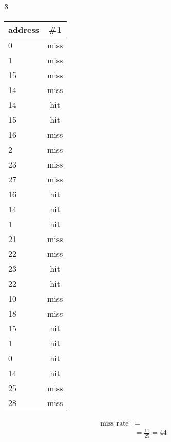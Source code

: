 \documentclass[11pt]{article}
\begin{document}
\paragraph{3}
\begin{center}
	\begin{tabular}{l || c}
		address & \#1 \\
		\hline
		0  & miss \\
		1  & miss \\
		15 & miss \\
		14 & miss \\
		14 & hit  \\
		15 & hit  \\
		16 & miss \\
		2  & miss \\
		23 & miss \\
		27 & miss \\
		16 & hit  \\
		14 & hit  \\
		1  & hit  \\
		21 & miss \\
		22 & miss \\
		23 & hit  \\
		22 & hit  \\
		10 & miss \\
		18 & miss \\
		15 & hit \\
		1  & hit  \\
		0  & hit \\
		14 & hit \\
		25 & miss \\
		28 & miss \\
	\end{tabular}
	\begin{align*}
		\text{miss rate} &= \\
		&= \frac{11}{25} = 44%
	\end{align*}
\end{center}
\end{document}
